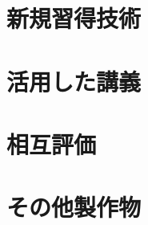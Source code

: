 \documentclass[openany,11pt,papersize]{jsbook}
\begin{document}
\begin{appendix}

\chapter{新規習得技術}

\chapter{活用した講義}

\chapter{相互評価}

\chapter{その他製作物}

\end{appendix}



\begin{thebibliography}{9}
\end{thebibliography}
\end{document}
